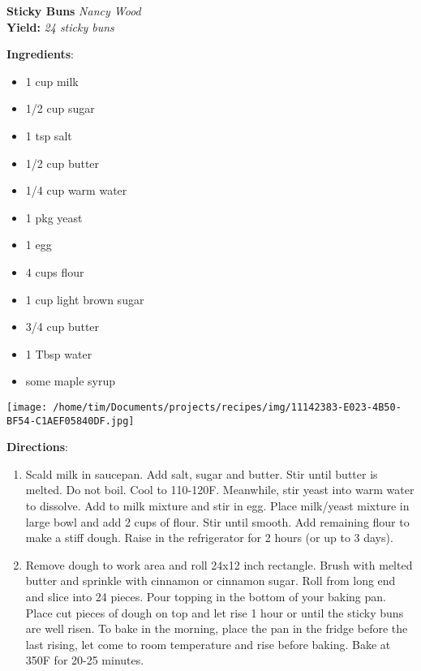 \documentclass[11pt, twoside, openany]{book}
\begin{document}
\noindent\begin{minipage}[t]{\linewidth}%
{\Large\textbf{Sticky Buns}} \label{sticky-buns}\hfill\textit{Nancy Wood}\\
\textbf{Yield:} \textit{24 sticky buns}\\
\noindent\begin{minipage}[t]{0.78\linewidth}%
\textbf{Ingredients}:\vspace{-3mm}
\begin{multicols}{2}
\begin{itemize}\setlength\itemsep{-1mm}
\item 1 cup milk
\item 1/2 cup sugar
\item 1 tsp salt
\item 1/2 cup butter
\item 1/4 cup warm water
\item 1 pkg yeast
\item 1 egg
\item 4 cups flour
\item 1 cup light brown sugar
\item 3/4 cup butter
\item 1 Tbsp water
\item some maple syrup
\end{itemize}
\end{multicols}
\end{minipage}
\noindent\begin{minipage}[t]{0.18\linewidth}
\centering \strut\vspace*{-\baselineskip}\newline
\texttt{[image: /home/tim/Documents/projects/recipes/img/11142383-E023-4B50-BF54-C1AEF05840DF.jpg]}\\
\end{minipage}\vspace{3mm}
\textbf{Directions}:
\vspace{-3mm}\begin{enumerate}\setlength\itemsep{-1mm}
\item Scald milk in saucepan. Add salt, sugar and butter. Stir until butter is melted. Do not boil. Cool to 110-120F. Meanwhile, stir yeast into warm water to dissolve. Add to milk mixture and stir in egg. Place milk/yeast mixture in large bowl and add 2 cups of flour. Stir until smooth. Add remaining flour to make a stiff dough. Raise in the refrigerator for 2 hours (or up to 3 days).
\item Remove dough to work area and roll 24x12 inch rectangle. Brush with melted butter and sprinkle with cinnamon or cinnamon sugar. Roll from long end and slice into 24 pieces. Pour topping in the bottom of your baking pan. Place cut pieces of dough on top and let rise 1 hour or until the sticky buns are well risen. To bake in the morning, place the pan in the fridge before the last rising, let come to room temperature and rise before baking. Bake at 350F for 20-25 minutes.
\end{enumerate}
\end{minipage}\vspace{8mm}
\end{document}
